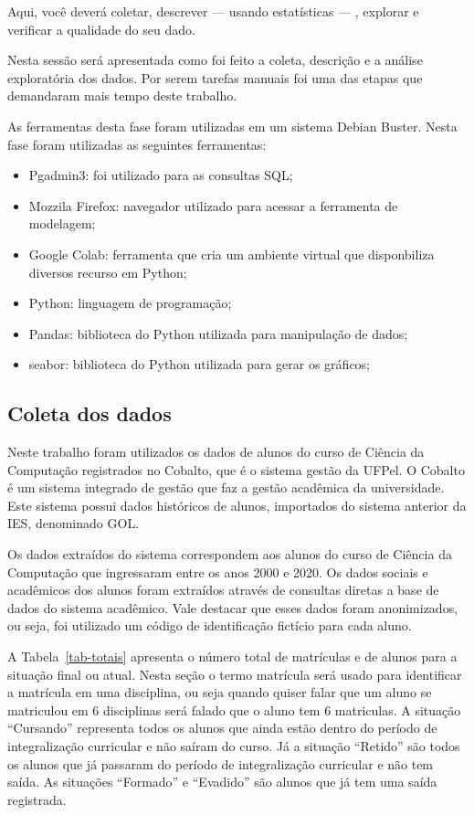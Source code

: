 \documentclass[diss,capa]{texufpel}
\begin{document}
Aqui, você deverá coletar, descrever — usando estatísticas — , explorar e verificar a qualidade do seu dado.

Nesta sessão será apresentada como foi feito a coleta, descrição e a análise exploratória dos dados. 
Por serem tarefas manuais foi uma das etapas que demandaram mais tempo deste trabalho.

As ferramentas desta fase foram utilizadas em um sistema Debian Buster.
Nesta fase foram utilizadas as seguintes ferramentas:

\begin{itemize}
    \item Pgadmin3: foi utilizado para as consultas SQL;
    \item Mozzila Firefox: navegador utilizado para acessar a ferramenta de modelagem;
    \item Google Colab: ferramenta que cria um ambiente virtual que disponbiliza diversos recurso em Python;
    \item Python: linguagem de programação;
    \item Pandas: biblioteca do Python utilizada para manipulação de dados;
    \item seabor: biblioteca do Python utilizada para gerar os gráficos; 
\end{itemize}

\subsection{Coleta dos dados}
\label{subsec:coleta-dos-dados}

Neste trabalho foram utilizados os dados de alunos do curso de Ciência da Computação registrados no Cobalto, que é o sistema gestão da UFPel.
O Cobalto é um sistema integrado de gestão que faz a gestão acadêmica da universidade.
Este sistema possui dados históricos de alunos, importados do sistema anterior da IES, denominado GOL.

Os dados extraídos do sistema correspondem aos alunos do curso de Ciência da Computação que ingressaram entre os anos 2000 e 2020.
Os dados sociais e acadêmicos dos alunos foram extraídos através de consultas diretas a base de dados do sistema acadêmico.
Vale destacar que esses dados foram anonimizados, ou seja, foi utilizado um código de identificação fictício para cada aluno.

A Tabela~\ref{tab-totais} apresenta o número total de matrículas e de alunos para a situação final ou atual.
Nesta seção o termo matrícula será usado para identificar a matrícula em uma disciplina, ou seja quando quiser falar que um aluno se matriculou em 6 disciplinas será falado que o aluno tem 6 matriculas.
A situação ``Cursando'' representa todos os alunos que ainda estão dentro do período de integralização curricular e não saíram do curso.
Já a situação ``Retido'' são todos os alunos que já passaram do período de integralização curricular e não tem saída. As situações ``Formado'' e ``Evadido'' são alunos que já tem uma saída registrada.
\end{document}
